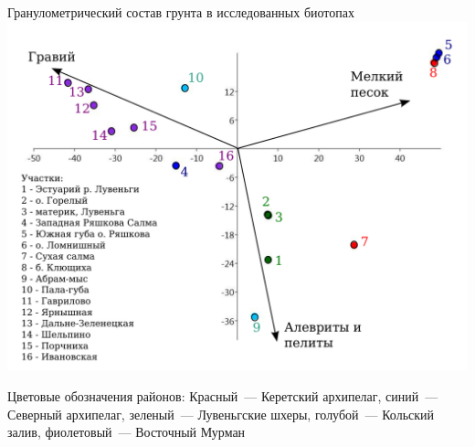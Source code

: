 \documentclass{beamer}
\begin{document}
\begin{frame}{Гранулометрический состав грунта в исследованных биотопах}
			\includegraphics[width=.9\textwidth]{Grunty.pdf}
%

{\tiny Цветовые обозначения районов: Красный~--- Керетский архипелаг, синий~--- Северный архипелаг, зеленый~--- Лувеньгские шхеры, голубой~--- Кольский залив, фиолетовый~--- Восточный Мурман}
\end{frame}
\end{document}

